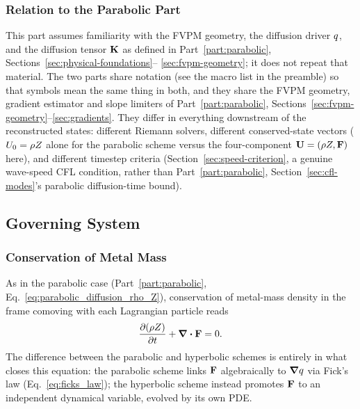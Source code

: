 \subsubsection{Relation to the Parabolic Part}
This part assumes familiarity with the FVPM geometry, the diffusion
driver $q$, and the diffusion tensor $\mathbf{K}$ as defined in
Part~\ref{part:parabolic}, Sections~\ref{sec:physical-foundations}--
\ref{sec:fvpm-geometry}; it does not repeat that material. The two parts
share notation (see the macro list in the preamble) so that symbols mean
the same thing in both, and they share the FVPM geometry, gradient
estimator and slope limiters of Part~\ref{part:parabolic},
Sections~\ref{sec:fvpm-geometry}--\ref{sec:gradients}. They differ in
everything downstream of the reconstructed states: different Riemann
solvers, different conserved-state vectors ($U_0=\rho Z$ alone for the
parabolic scheme versus the four-component $\mathbf{U}=(\rho Z,\mathbf{F})$ here),
and different timestep criteria (Section~\ref{sec:speed-criterion}, a
genuine wave-speed CFL condition, rather than
Part~\ref{part:parabolic}, Section~\ref{sec:cfl-modes}'s parabolic
diffusion-time bound).

\subsection{Governing System}
\label{sec:governing-system}

\subsubsection{Conservation of Metal Mass}
As in the parabolic case (Part~\ref{part:parabolic},
Eq.~\eqref{eq:parabolic_diffusion_rho_Z}), conservation of metal-mass
density in the frame comoving with each Lagrangian particle reads
\begin{equation}
  \label{eq:mass_conservation}
  \pdv{(\rho Z)}{t} + \div \mathbf{F} = 0 .
\end{equation}
The difference between the parabolic and hyperbolic schemes is entirely in
what closes this equation: the parabolic scheme links $\mathbf{F}$
algebraically to $\grad q$ via Fick's law
(Eq.~\eqref{eq:ficks_law}); the hyperbolic scheme instead promotes
$\mathbf{F}$ to an independent dynamical variable, evolved by its own PDE.

